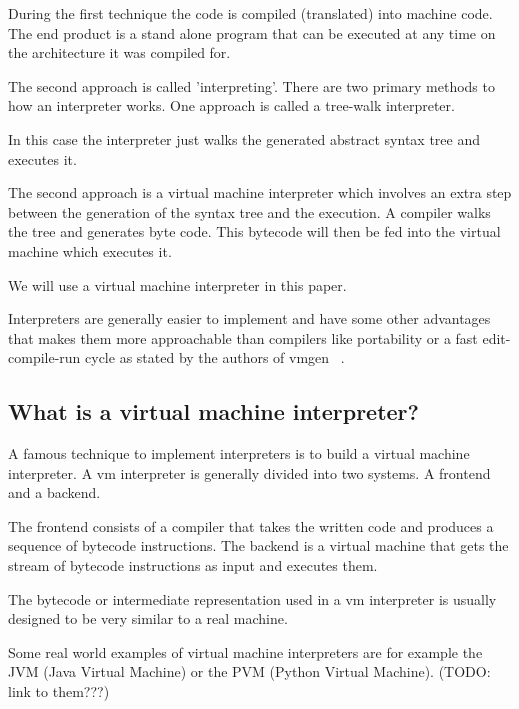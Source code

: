 \documentclass{article}
\begin{document}
During the first technique the code is compiled (translated) into machine code.
The end product is a stand alone program that can be executed at any time on the
architecture it was compiled for.

The second approach is called 'interpreting'. There are two primary methods
to how an interpreter works. One approach is called a tree-walk interpreter.

In this case the interpreter just walks the generated abstract syntax tree
and executes it.

The second approach is a virtual machine interpreter which involves an extra
step between the generation of the syntax tree and the execution. A compiler
walks the tree and generates byte code. This bytecode will then be fed into
the virtual machine which executes it.

We will use a virtual machine interpreter in this paper.

Interpreters are generally easier to implement and have some other advantages
that makes them more approachable than compilers like portability or a fast
edit-compile-run cycle as stated by the authors of vmgen ~\cite{vmgen}. 


\subsection{What is a virtual machine interpreter?}
A famous technique to implement interpreters is to build a virtual machine
interpreter. A vm interpreter is generally divided into two systems. A frontend
and a backend. ~\cite{vmgen}

The frontend consists of a compiler that takes the written code and produces a
sequence of bytecode instructions. The backend is a virtual machine that gets
the stream of bytecode instructions as input and executes them. ~\cite{vmgen}

The bytecode or intermediate representation used in a vm interpreter is usually
designed to be very similar to a real machine. ~\cite{vmgen}

Some real world examples of virtual machine interpreters are for example the
JVM (Java Virtual Machine) or the PVM (Python Virtual Machine). (TODO: link to them???)
\end{document}
